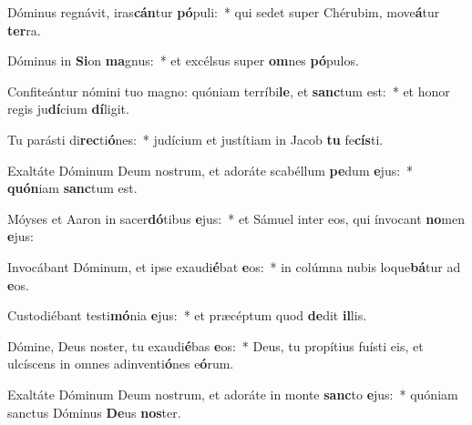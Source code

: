 \item Dóminus regnávit, iras\textbf{cán}tur \textbf{pó}puli:~* qui sedet super Chérubim, move\textbf{á}tur \textbf{ter}ra.
\item Dóminus in \textbf{Si}on \textbf{ma}gnus:~* et excélsus super \textbf{om}nes \textbf{pó}pulos.
\item Confiteántur nómini tuo magno: quóniam terríbi\textbf{le}, et \textbf{sanc}tum est:~* et honor regis ju\textbf{dí}cium \textbf{dí}ligit.
\item Tu parásti di\textbf{rec}ti\textbf{ó}nes:~* judícium et justítiam in Jacob \textbf{tu} fe\textbf{cís}ti.
\item Exaltáte Dóminum Deum nostrum, et adoráte scabéllum \textbf{pe}dum \textbf{e}jus:~* \textbf{quón}iam \textbf{sanc}tum est.
\item Móyses et Aaron in sacer\textbf{dó}tibus \textbf{e}jus:~* et Sámuel inter eos, qui ínvocant \textbf{no}men \textbf{e}jus:
\item Invocábant Dóminum, et ipse exaudi\textbf{é}bat \textbf{e}os:~* in colúmna nubis loque\textbf{bá}tur ad \textbf{e}os.
\item Custodiébant testi\textbf{mó}nia \textbf{e}jus:~* et præcéptum quod \textbf{de}dit \textbf{il}lis.
\item Dómine, Deus noster, tu exaudi\textbf{é}bas \textbf{e}os:~* Deus, tu propítius fuísti eis, et ulcíscens in omnes adinventi\textbf{ó}nes e\textbf{ó}rum.
\item Exaltáte Dóminum Deum nostrum, et adoráte in monte \textbf{sanc}to \textbf{e}jus:~* quóniam sanctus Dóminus \textbf{De}us \textbf{nos}ter.
